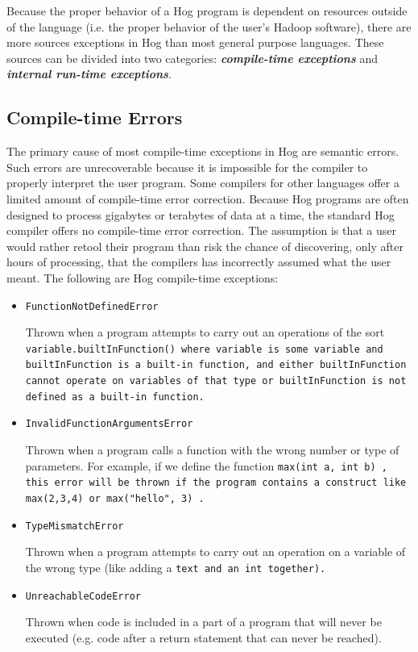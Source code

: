 \documentclass{report}
\begin{document}
Because the proper behavior of a Hog program is dependent on resources outside of
the language (i.e. the proper behavior of the user’s Hadoop software), there are
more sources exceptions in Hog than most general purpose languages. These sources
can be divided into two categories: \textbf{\emph{compile­-time exceptions}} and
\textbf{\emph{internal run­-time exceptions}}.

\subsection{Compile-time Errors} %
\label{sub:compile_time_exceptions}

The primary cause of most compile-­time exceptions in Hog are semantic errors. Such
errors are unrecoverable because it is impossible for the compiler to properly
interpret the user program. Some compilers for other languages offer a limited
amount of compile-­time error correction. Because Hog programs are often designed
to process gigabytes or terabytes of data at a time, the standard Hog compiler
offers no compile-­time error correction. The assumption is that a user would
rather re­tool their program than risk the chance of discovering, only after hours
of processing, that the compilers has incorrectly assumed what the user meant. The
following are Hog compile-­time exceptions:

\begin{itemize}
  
  \item[] \tt FunctionNotDefinedError \rm
  
   Thrown when a program attempts to carry out an operations of the sort \tt
variable.builtInFunction() \rm where \tt variable \rm is some variable and \tt
builtInFunction \rm is a built-in function, and either \tt builtInFunction \rm
cannot operate on variables of that type or \tt builtInFunction \rm  is not
defined as a built-in function.
  
  \item[] \tt InvalidFunctionArgumentsError \rm
   
    Thrown when a program calls a function with the wrong number or type of
parameters. For example, if we define the function \tt max(int a, int b) \rm,
this error will be thrown if the program contains a construct like \tt
max(2,3,4) \rm or \tt max("hello", 3) \rm.

   \item[] \tt TypeMismatchError \rm  

   Thrown when a program attempts to carry out an operation on a variable of
the wrong type (like adding a \tt text \rm and an \tt int \rm together).
  
   \item[] \tt UnreachableCodeError \rm

   Thrown when code is included in a part of a program that will never be
executed (e.g. code after a return statement that can never be reached).

\end{itemize}
\end{document}
